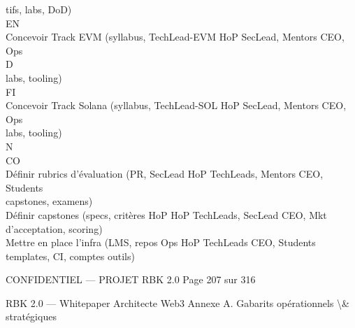\documentclass[12pt,landscape,a4paper]{article}
\newenvironment{confidential}
{\begin{tcolorbox}[
    colback=rbkred!5!white,
    colframe=rbkred!75!black,
    title=CONFIDENTIEL,
    fonttitle=\bfseries\color{white},
    coltitle=rbkred!75!black,
    breakable,
    enhanced,
    frame hidden,
    borderline west={2pt}{0pt}{rbkred!75!black}
]}
{\end{tcolorbox}}
\begin{document}
tifs, labs, DoD)\\
\vspace{0.5em}
\vspace{0.5em}
\vspace{0.5em}
\vspace{0.5em}
EN\\
Concevoir Track EVM (syllabus,       TechLead-EVM     HoP              SecLead, Mentors            CEO, Ops\\
\vspace{0.5em}
\vspace{0.5em}
\vspace{0.5em}
\vspace{0.5em}
D\\
labs, tooling)\\
\vspace{0.5em}
\vspace{0.5em}
\vspace{0.5em}
\vspace{0.5em}
FI\\
Concevoir Track Solana (syllabus,    TechLead-SOL     HoP              SecLead, Mentors            CEO, Ops\\
labs, tooling)\\
N\\
CO\\
Définir rubrics d’évaluation (PR,    SecLead          HoP              TechLeads, Mentors          CEO, Students\\
capstones, examens)\\
Définir capstones (specs, critères   HoP              HoP              TechLeads, SecLead          CEO, Mkt\\
d’acceptation, scoring)\\
Mettre en place l’infra (LMS, repos Ops               HoP              TechLeads                   CEO, Students\\
templates, CI, comptes outils)\\
\vspace{0.5em}
\vspace{0.5em}
\vspace{0.5em}
\vspace{0.5em}
\begin{confidential}CONFIDENTIEL — PROJET RBK 2.0                          Page 207 sur 316\end{confidential}
RBK 2.0 — Whitepaper Architecte Web3                                                        Annexe A. Gabarits opérationnels \textbackslash{}& stratégiques\\
\end{document}
